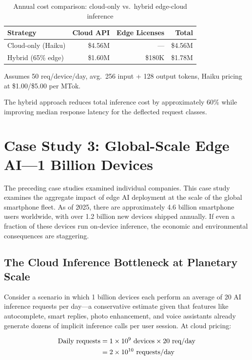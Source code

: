 \documentclass[12pt, letterpaper, twoside]{report}
\begin{document}
\begin{table}[H]
\centering
\caption{Annual cost comparison: cloud-only vs.\ hybrid edge-cloud inference}
\label{tab:hybrid_cost}
{\small
\begin{tabular}{@{}lrrr@{}}
\toprule
\textbf{Strategy} & \textbf{Cloud API} & \textbf{Edge Licenses} & \textbf{Total} \\
\midrule
Cloud-only (Haiku) & \$4.56M & --- & \$4.56M \\
Hybrid (65\% edge) & \$1.60M & \$180K & \$1.78M \\
\bottomrule
\end{tabular}
}
\vspace{4pt}
{\scriptsize Assumes 50 req/device/day, avg.\ 256 input + 128 output tokens, Haiku pricing at \$1.00/\$5.00 per MTok.}
\end{table}

The hybrid approach reduces total inference cost by approximately 60\% while improving median response latency for the deflected request classes.

\section{Case Study 3: Global-Scale Edge AI---1 Billion Devices}
\label{sec:global_case_study}

The preceding case studies examined individual companies. This case study examines the aggregate impact of edge AI deployment at the scale of the global smartphone fleet. As of 2025, there are approximately 4.6 billion smartphone users worldwide, with over 1.2 billion new devices shipped annually. If even a fraction of these devices run on-device inference, the economic and environmental consequences are staggering.

\subsection{The Cloud Inference Bottleneck at Planetary Scale}

Consider a scenario in which 1 billion devices each perform an average of 20 AI inference requests per day---a conservative estimate given that features like autocomplete, smart replies, photo enhancement, and voice assistants already generate dozens of implicit inference calls per user session. At cloud pricing:

\begin{align}
\text{Daily requests} &= 1 \times 10^{9} \text{ devices} \times 20 \text{ req/day} \notag \\
  &= 2 \times 10^{10} \text{ requests/day} \notag
\end{align}
\end{document}
